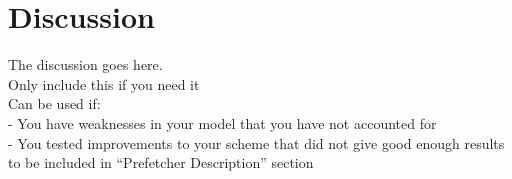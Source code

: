 \section{Discussion}
The discussion goes here.
\\
Only include this if you need it\\
Can be used if:\\
- You have weaknesses in your model that you have not accounted for\\
- You tested improvements to your scheme that did not give good 
enough results to be included in “Prefetcher Description” section\\